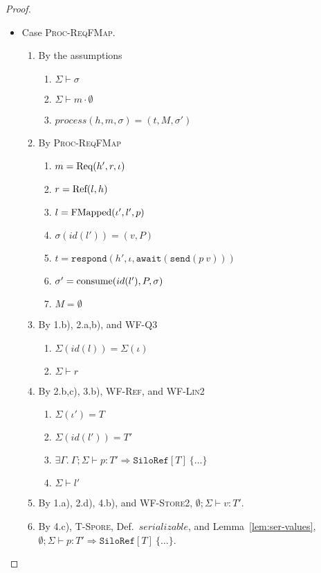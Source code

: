 \begin{proof}
\begin{itemize}
\item Case \textsc{Proc-ReqFMap}.
\begin{enumerate}
\item By the assumptions
  \begin{enumerate}[label=(\alph*)]
  \item $\Sigma \vdash \sigma$
  \item $\Sigma \vdash m \cdot \emptyset$
  \item $process(h, m, \sigma) = (t, M, \sigma')$
  \end{enumerate}
\item By \textsc{Proc-ReqFMap}
  \begin{enumerate}[label=(\alph*)]
  \item $m = {\textrm{Req}(h', r, \iota)}$
  \item $r = {\textrm{Ref}(l, h)}$
  \item $l = {\textrm{FMapped}(\iota', l', p)}$
  \item $\sigma(id(l')) = (v, P)$
  \item $t = \texttt{respond}(h', \iota, \texttt{await}(\texttt{send}(p~v)))$
  \item $\sigma' = {\textrm{consume}(id(l'), P, \sigma)}$
  \item $M = \emptyset$
  \end{enumerate}
\item By 1.b), 2.a,b), and \textsc{WF-Q3}
  \begin{enumerate}[label=(\alph*)]
  \item $\Sigma(id(l)) = \Sigma(\iota)$
  \item $\Sigma \vdash r$
  \end{enumerate}
\item By 2.b,c), 3.b), \textsc{WF-Ref}, and \textsc{WF-Lin2}
  \begin{enumerate}[label=(\alph*)]
  \item $\Sigma(\iota') = T$
  \item $\Sigma(id(l')) = T'$
  \item $\exists \Gamma.~\Gamma ; \Sigma \vdash p : T' \Rightarrow \texttt{SiloRef}[T]~\{\ldots\}$
  \item $\Sigma \vdash l'$
  \end{enumerate}
\item By 1.a), 2.d), 4.b), and \textsc{WF-Store2}, $\emptyset ; \Sigma \vdash v : T'$.
\item By 4.c), \textsc{T-Spore}, Def.~$serializable$, and Lemma~\ref{lem:ser-values}, $\emptyset ; \Sigma \vdash p : T' \Rightarrow \texttt{SiloRef}[T]~\{\ldots\}$.

\end{enumerate}
\end{itemize}
\end{proof}
